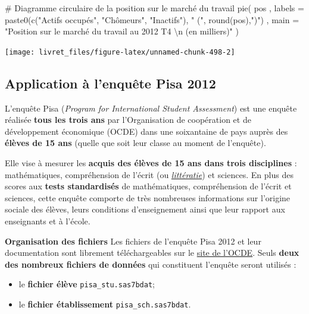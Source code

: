 \documentclass[12pt,twosided, notitlepage]{book}
\newenvironment{Shaded}{}{}
\newcommand{\KeywordTok}[1]{\textcolor[rgb]{0.00,0.00,1.00}{{#1}}}
\newcommand{\DataTypeTok}[1]{{#1}}
\newcommand{\CharTok}[1]{\textcolor[rgb]{0.00,0.50,0.50}{{#1}}}
\newcommand{\StringTok}[1]{\textcolor[rgb]{0.00,0.50,0.50}{{#1}}}
\newcommand{\CommentTok}[1]{\textcolor[rgb]{0.00,0.50,0.00}{{#1}}}
\newcommand{\NormalTok}[1]{{#1}}
\providecommand{\tightlist}{%
  \setlength{\itemsep}{0pt}\setlength{\parskip}{0pt}}
\renewenvironment{Shaded}{\begin{snugshade}}{\end{snugshade}}
\begin{document}
\begin{itemize}
\begin{Shaded}
\begin{Highlighting}[]
\CommentTok{# Diagramme circulaire de la position sur le marché du travail}
\KeywordTok{pie}\NormalTok{(}
  \NormalTok{pos}
  \NormalTok{, }\DataTypeTok{labels =} \KeywordTok{paste0}\NormalTok{(}\KeywordTok{c}\NormalTok{(}\StringTok{"Actifs occupés"}\NormalTok{, }\StringTok{"Chômeurs"}\NormalTok{, }\StringTok{"Inactifs"}\NormalTok{), }\StringTok{" ("}\NormalTok{, }\KeywordTok{round}\NormalTok{(pos),}\StringTok{")"}\NormalTok{)}
  \NormalTok{, }\DataTypeTok{main =} \StringTok{"Position sur le marché du travail au 2012 T4 }\CharTok{\textbackslash{}n}\StringTok{ (en milliers)"}
\NormalTok{)}
\end{Highlighting}
\end{Shaded}

  \begin{center}\texttt{[image: livret\_files/figure-latex/unnamed-chunk-498-2]} \end{center}
\end{itemize}

\subsection{Application à l'enquête Pisa
2012}\label{application-a-lenquete-pisa-2012}

L'enquête Pisa (\textit{Program for International Student Assessment})
est une enquête réalisée \textbf{tous les trois ans} par l'Organisation
de coopération et de développement économique (OCDE) dans une
soixantaine de pays auprès des \textbf{élèves de 15 ans} (quelle que
soit leur classe au moment de l'enquête).

Elle vise à mesurer les \textbf{acquis des élèves de 15 ans dans trois
disciplines} : mathématiques, compréhension de l'écrit (ou
\href{https://fr.wikipedia.org/wiki/Litt\%C3\%A9ratie}{\emph{littératie}})
et sciences. En plus des scores aux \textbf{tests standardisés} de
mathématiques, compréhension de l'écrit et sciences, cette enquête
comporte de très nombreuses informations sur l'origine sociale des
élèves, leurs conditions d'enseignement ainsi que leur rapport aux
enseignants et à l'école.

\textbf{Organisation des fichiers} Les fichiers de l'enquête Pisa 2012
et leur documentation sont librement téléchargeables sur le
\href{http://www.oecd.org/pisa/pisaproducts/pisa2012database-downloadabledata.htm}{site
de l'OCDE}. Seuls \textbf{deux des nombreux fichiers de données} qui
constituent l'enquête seront utilisés :

\begin{itemize}
\tightlist
\item
  le \textbf{fichier élève} \texttt{pisa\_stu.sas7bdat};
\item
  le \textbf{fichier établissement} \texttt{pisa\_sch.sas7bdat}.
\end{itemize}
\end{document}
